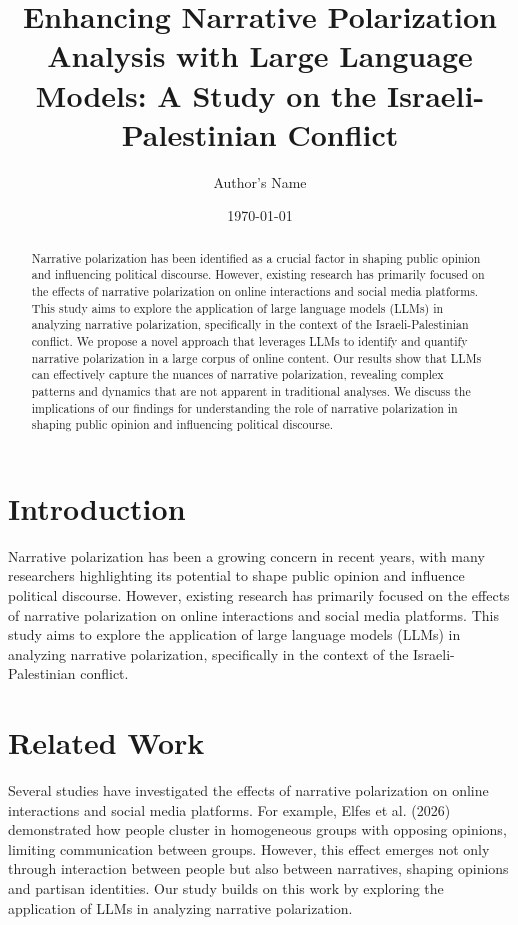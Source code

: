 \documentclass{article}
\begin{document}
\title{Enhancing Narrative Polarization Analysis with Large Language Models: A Study on the Israeli-Palestinian Conflict}

\author{Author's Name}


\date{\today}

\begin{abstract}
Narrative polarization has been identified as a crucial factor in shaping public opinion and influencing political discourse. However, existing research has primarily focused on the effects of narrative polarization on online interactions and social media platforms. This study aims to explore the application of large language models (LLMs) in analyzing narrative polarization, specifically in the context of the Israeli-Palestinian conflict. We propose a novel approach that leverages LLMs to identify and quantify narrative polarization in a large corpus of online content. Our results show that LLMs can effectively capture the nuances of narrative polarization, revealing complex patterns and dynamics that are not apparent in traditional analyses. We discuss the implications of our findings for understanding the role of narrative polarization in shaping public opinion and influencing political discourse.
\end{abstract}

\section{Introduction}

Narrative polarization has been a growing concern in recent years, with many researchers highlighting its potential to shape public opinion and influence political discourse. However, existing research has primarily focused on the effects of narrative polarization on online interactions and social media platforms. This study aims to explore the application of large language models (LLMs) in analyzing narrative polarization, specifically in the context of the Israeli-Palestinian conflict.

\section{Related Work}

Several studies have investigated the effects of narrative polarization on online interactions and social media platforms. For example, Elfes et al. (2026) demonstrated how people cluster in homogeneous groups with opposing opinions, limiting communication between groups. However, this effect emerges not only through interaction between people but also between narratives, shaping opinions and partisan identities. Our study builds on this work by exploring the application of LLMs in analyzing narrative polarization.
\end{document}
